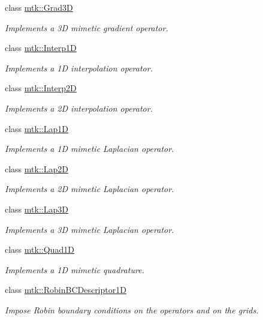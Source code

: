\begin{DoxyCompactItemize}
class \hyperlink{classmtk_1_1Grad3D}{mtk\+::\+Grad3\+D}
\begin{DoxyCompactList}\small\item\em Implements a 3\+D mimetic gradient operator. \end{DoxyCompactList}\item 
class \hyperlink{classmtk_1_1Interp1D}{mtk\+::\+Interp1\+D}
\begin{DoxyCompactList}\small\item\em Implements a 1\+D interpolation operator. \end{DoxyCompactList}\item 
class \hyperlink{classmtk_1_1Interp2D}{mtk\+::\+Interp2\+D}
\begin{DoxyCompactList}\small\item\em Implements a 2\+D interpolation operator. \end{DoxyCompactList}\item 
class \hyperlink{classmtk_1_1Lap1D}{mtk\+::\+Lap1\+D}
\begin{DoxyCompactList}\small\item\em Implements a 1\+D mimetic Laplacian operator. \end{DoxyCompactList}\item 
class \hyperlink{classmtk_1_1Lap2D}{mtk\+::\+Lap2\+D}
\begin{DoxyCompactList}\small\item\em Implements a 2\+D mimetic Laplacian operator. \end{DoxyCompactList}\item 
class \hyperlink{classmtk_1_1Lap3D}{mtk\+::\+Lap3\+D}
\begin{DoxyCompactList}\small\item\em Implements a 3\+D mimetic Laplacian operator. \end{DoxyCompactList}\item 
class \hyperlink{classmtk_1_1Quad1D}{mtk\+::\+Quad1\+D}
\begin{DoxyCompactList}\small\item\em Implements a 1\+D mimetic quadrature. \end{DoxyCompactList}\item 
class \hyperlink{classmtk_1_1RobinBCDescriptor1D}{mtk\+::\+Robin\+B\+C\+Descriptor1\+D}
\begin{DoxyCompactList}\small\item\em Impose Robin boundary conditions on the operators and on the grids. \end{DoxyCompactList}\item 

\end{DoxyCompactItemize}
